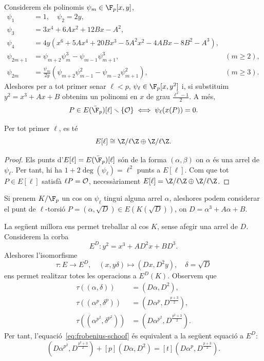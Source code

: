  \begin{theorem}
  Considerem els polinomis $\psi_m\in\F_p[x,y]$,
  \begin{align*}
  \psi_1&=1,\quad \psi_2=2y,\\
  \psi_3 &= 3x^4+6Ax^2+12Bx-A^2,\\
  \psi_4&=4y(x^6+5Ax^4+20Bx^3-5A^2x^2-4ABx-8B^2-A^3),\\
  \psi_{2m+1}&=\psi_{m+2}\psi_{m}^3 - \psi_{m-1}\psi_{m+1}^3,& (m\geq 2),\\
  \psi_{2m}&=\frac{\psi_m}{2y}(\psi_{m+2}\psi_{m-1}^2-\psi_{m-2}\psi_{m+1}^2),& (m\geq 3).
  \end{align*}
  Aleshores per a tot primer senar $\ell<p$, $\psi_\ell\in \F_p[x,y^2]$ i, si substituim $y^2=x^3+Ax+B$ obtenim un polinomi en $x$ de grau $\frac{\ell^2-1}{2}$. A més,
  \[
  P\in E(\bar\F_p)[\ell]\smallsetminus\{\calO\}\iff \psi_\ell(x(P))=0. 
  \]
 \end{theorem}
 \begin{corollary}
 Per tot primer $\ell$, es té
  \[
  E[\ell]\cong\Z/\ell\Z\oplus\Z/\ell\Z.
  \]
 \end{corollary}
 \begin{proof}
  Els punts d'$E[\ell]=E(\bar\F_p)[\ell]$ són de la forma $(\alpha, \beta)$ on $\alpha$ és una arrel de $\psi_\ell$. Per tant, hi ha $1+2\deg(\psi_\ell)=\ell^2$ punts a $E[\ell]$. Com que tot $P\in E[\ell]$ satisfà $\ell P=\mathcal{O}$, necessàriament $E[\ell]=\Z/\ell\Z\oplus\Z/\ell\Z$.
 \end{proof}
 Si prenem $K/\F_p$ un cos on $\psi_\ell$ tingui alguna arrel $\alpha$, aleshores podem considerar el punt de $\ell$-torsió $P=(\alpha,\sqrt{D})\in E(K(\sqrt{D}))$, on $D=\alpha^3+A\alpha+B$.
 
 La següent millora ens permet treballar al cos $K$, sense afegir una arrel de $D$. Considerem la corba
 \[
 E^D \colon y^2 = x^3 + AD^2x + BD^3.
 \]
 Aleshores l'isomorfisme
 \[
 \tau\colon E\to E^D,\quad (x,y\delta)\mapsto (Dx,D^2y), \quad \delta=\sqrt{D}
 \]
 ens permet realitzar totes les operacions a $E^D(K)$. Observem que
\begin{align*}
    \tau((\alpha,\delta)) &= (D\alpha, D^2),\\
    \tau((\alpha^p,\delta^p)) &=(D\alpha^p,D^{\frac{p+3}{2}}),\\
    \tau((\alpha^{p^2},\delta^{p^2})) &=(D\alpha^{p^2},D^{\frac{p^2+3}{2}}).
\end{align*}
Per tant, l'equació~\eqref{eq:frobenius-schoof} és equivalent a la següent equació a $E^D$:
\[
(D\alpha^{p^2},D^{\frac{p^2+3}{2}}) + [p] (D\alpha,D^2) = [t] (D\alpha^p,D^{\frac{p+3}{2}}).
\]


